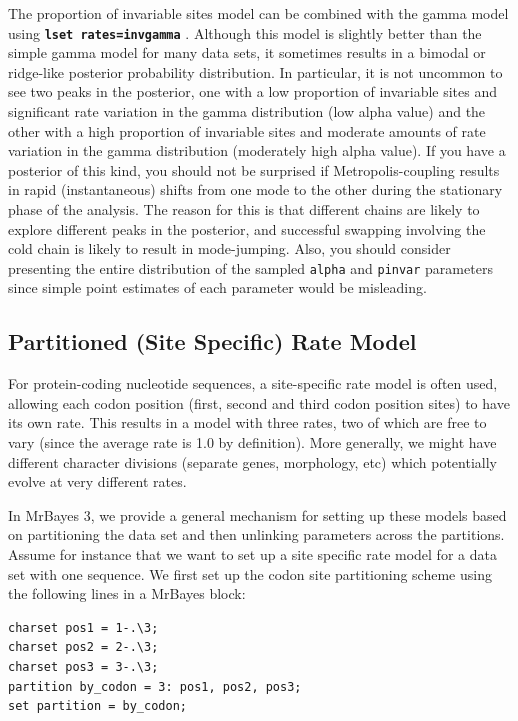 \documentclass[12pt]{book}
\newcommand{\ttt}[1]{\texttt{#1} }
\newcommand{\tb}[1]{\texttt{\textbf{#1}} }
\begin{document}
The proportion of invariable sites model can be combined with the gamma model using
\tb{lset rates=invgamma}. Although this model is slightly better than the simple
gamma model for many data sets, it sometimes results in a bimodal or ridge-like posterior
probability distribution. In particular, it is not uncommon to see two peaks in the
posterior, one with a low proportion of invariable sites and significant rate variation in
the gamma distribution (low alpha value) and the other with a high proportion of
invariable sites and moderate amounts of rate variation in the gamma distribution
(moderately high alpha value). If you have a posterior of this kind, you should not be
surprised if Metropolis-coupling results in rapid (instantaneous) shifts from one mode to
the other during the stationary phase of the analysis. The reason for this is that different
chains are likely to explore different peaks in the posterior, and successful swapping
involving the cold chain is likely to result in mode-jumping. Also, you should consider
presenting the entire distribution of the sampled \ttt{alpha} and \ttt{pinvar} parameters since
simple point estimates of each parameter would be misleading.

\subsection{Partitioned (Site Specific) Rate Model}
For protein-coding nucleotide sequences, a site-specific rate model is often used,
allowing each codon position (first, second and third codon position sites) to have its own
rate. This results in a model with three rates, two of which are free to vary (since the
average rate is 1.0 by definition). More generally, we might have different character
divisions (separate genes, morphology, etc) which potentially evolve at very different
rates.

In MrBayes 3, we provide a general mechanism for setting up these models based on
partitioning the data set and then unlinking parameters across the partitions. Assume for
instance that we want to set up a site specific rate model for a data set with one sequence.
We first set up the codon site partitioning scheme using the following lines in a MrBayes
block:

\begin{singlespacing}
\small
\begin{verbatim}
charset pos1 = 1-.\3;
charset pos2 = 2-.\3;
charset pos3 = 3-.\3;
partition by_codon = 3: pos1, pos2, pos3;
set partition = by_codon;
\end{verbatim}
\normalsize
\end{singlespacing}
\end{document}
